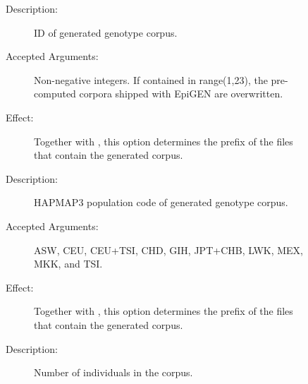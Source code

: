 \documentclass[a4paper,10pt,english]{sphinxhowto}
\begin{document}
\begin{sphinxVerbatim}[commandchars=\\\{\}]
  \PYG{p}{[} \PYG{p}{]} \PYG{p}{[} \PYG{p}{]}
\end{sphinxVerbatim}
\begin{description}
\item[{}] \leavevmode\begin{description}
\item[{}] \leavevmode\begin{description}
\item[{Description:}] \leavevmode
ID of generated genotype corpus.

\item[{Accepted Arguments:}] \leavevmode
Non-negative integers. If contained in range(1,23), the pre-computed corpora shipped with EpiGEN are overwritten.

\item[{Effect:}] \leavevmode
Together with , this option determines the prefix  of the files
that contain the generated corpus.

\end{description}

\item[{}] \leavevmode\begin{description}
\item[{Description:}] \leavevmode
HAPMAP3 population code of generated genotype corpus.

\item[{Accepted Arguments:}] \leavevmode
ASW, CEU, CEU+TSI, CHD, GIH, JPT+CHB, LWK, MEX, MKK, and TSI.

\item[{Effect:}] \leavevmode
Together with , this option determines the prefix  of the files
that contain the generated corpus.

\end{description}

\item[{}] \leavevmode\begin{description}
\item[{Description:}] \leavevmode
Number of individuals in the corpus.


\end{description}
\end{description}
\end{description}
\end{document}
